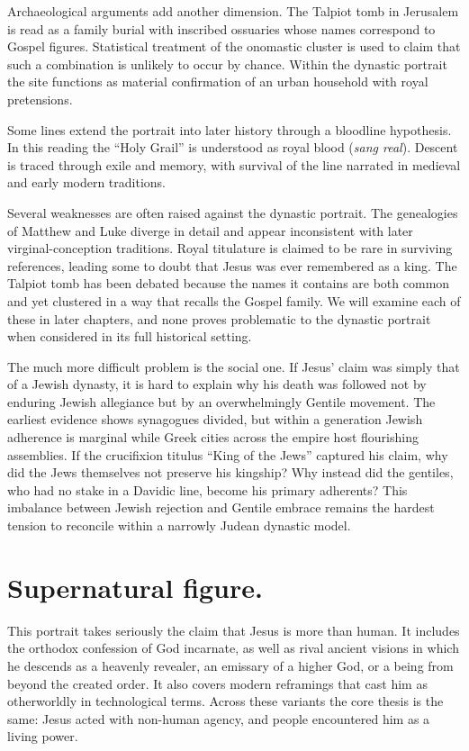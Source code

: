Archaeological arguments add another dimension.
The Talpiot tomb in Jerusalem is read as a family burial with inscribed ossuaries whose names correspond to Gospel figures.
Statistical treatment of the onomastic cluster is used to claim that such a combination is unlikely to occur by chance.
Within the dynastic portrait the site functions as material confirmation of an urban household with royal pretensions.

Some lines extend the portrait into later history through a bloodline hypothesis.
In this reading the ``Holy Grail'' is understood as royal blood (\emph{sang real}).
Descent is traced through exile and memory, with survival of the line narrated in medieval and early modern traditions.

Several weaknesses are often raised against the dynastic portrait.
The genealogies of Matthew and Luke diverge in detail and appear inconsistent with later virginal-conception traditions.
Royal titulature is claimed to be rare in surviving references, leading some to doubt that Jesus was ever remembered as a king.
The Talpiot tomb has been debated because the names it contains are both common and yet clustered in a way that recalls the Gospel family.
We will examine each of these in later chapters, and none proves problematic to the dynastic portrait when considered in its full historical setting.

The much more difficult problem is the social one.
If Jesus’ claim was simply that of a Jewish dynasty, it is hard to explain why his death was followed not by enduring Jewish allegiance but by an overwhelmingly Gentile movement.
The earliest evidence shows synagogues divided, but within a generation Jewish adherence is marginal while Greek cities across the empire host flourishing assemblies.
If the crucifixion titulus “King of the Jews” captured his claim, why did the Jews themselves not preserve his kingship?
Why instead did the gentiles, who had no stake in a Davidic line, become his primary adherents?
This imbalance between Jewish rejection and Gentile embrace remains the hardest tension to reconcile within a narrowly Judean dynastic model.

\section{Supernatural figure.}\label{sec:supernatural}

This portrait takes seriously the claim that Jesus is more than human.
It includes the orthodox confession of God incarnate, as well as rival ancient visions in which he descends as a heavenly revealer, an emissary of a higher God, or a being from beyond the created order.
It also covers modern reframings that cast him as otherworldly in technological terms.
Across these variants the core thesis is the same: Jesus acted with non-human agency, and people encountered him as a living power.

